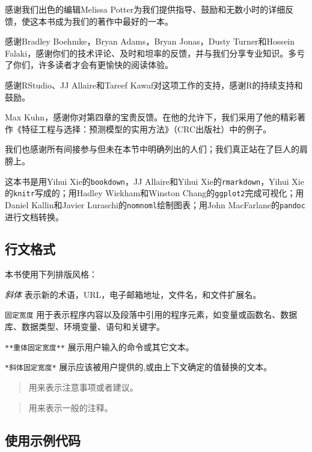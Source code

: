 \documentclass[
]{article}
\begin{document}
感谢我们出色的编辑Melissa
Potter为我们提供指导、鼓励和无数小时的详细反馈，使这本书成为我们的著作中最好的一本。

感谢Bradley Boehmke，Bryan Adams，Bryan Jonas，Dusty Turner和Hossein
Falaki，感谢你们的技术评论、及时和坦率的反馈，并与我们分享专业知识。多亏了你们，许多读者才会有更愉快的阅读体验。

感谢RStudio、JJ Allaire和Tareef
Kawaf对这项工作的支持，感谢R的持续支持和鼓励。

Max
Kuhn，感谢你对第四章的宝贵反馈。在他的允许下，我们采用了他的精彩著作《特征工程与选择：预测模型的实用方法》（CRC出版社）中的例子。

我们也感谢所有间接参与但未在本节中明确列出的人们；我们真正站在了巨人的肩膀上。

这本书是用Yihui Xie的\texttt{bookdown}，JJ Allaire和Yihui
Xie的\texttt{rmarkdown}，Yihui Xie的\texttt{knitr}写成的；用Hadley
Wickham和Winston Chang的\texttt{ggplot2}完成可视化；用Daniel
Kallin和Javier Luraschi的\texttt{nomnoml}绘制图表；用John
MacFarlane的\texttt{pandoc}进行文档转换。

\hypertarget{ux884cux6587ux683cux5f0f}{%
\subsection{行文格式}\label{ux884cux6587ux683cux5f0f}}

本书使用下列排版风格：

\emph{斜体} 表示新的术语，URL，电子邮箱地址，文件名，和文件扩展名。

\texttt{固定宽度}
用于表示程序内容以及段落中引用的程序元素，如变量或函数名、数据库、数据类型、环境变量、语句和关键字。

\texttt{**重体固定宽度**} 展示用户输入的命令或其它文本。

\texttt{*斜体固定宽度*}
展示应该被用户提供的,或由上下文确定的值替换的文本。

\begin{quote}
用来表示注意事项或者建议。
\end{quote}

\begin{quote}
用来表示一般的注释。
\end{quote}

\hypertarget{ux4f7fux7528ux793aux4f8bux4ee3ux7801}{%
\subsection{使用示例代码}\label{ux4f7fux7528ux793aux4f8bux4ee3ux7801}}
\end{document}

